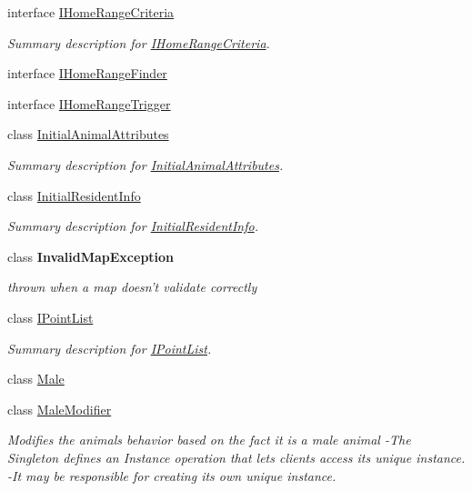 \begin{DoxyCompactItemize}
interface \hyperlink{interface_p_a_z___dispersal_1_1_i_home_range_criteria}{I\-Home\-Range\-Criteria}
\begin{DoxyCompactList}\small\item\em Summary description for \hyperlink{interface_p_a_z___dispersal_1_1_i_home_range_criteria}{I\-Home\-Range\-Criteria}. \end{DoxyCompactList}\item 
interface \hyperlink{interface_p_a_z___dispersal_1_1_i_home_range_finder}{I\-Home\-Range\-Finder}
\item 
interface \hyperlink{interface_p_a_z___dispersal_1_1_i_home_range_trigger}{I\-Home\-Range\-Trigger}
\item 
class \hyperlink{class_p_a_z___dispersal_1_1_initial_animal_attributes}{Initial\-Animal\-Attributes}
\begin{DoxyCompactList}\small\item\em Summary description for \hyperlink{class_p_a_z___dispersal_1_1_initial_animal_attributes}{Initial\-Animal\-Attributes}. \end{DoxyCompactList}\item 
class \hyperlink{class_p_a_z___dispersal_1_1_initial_resident_info}{Initial\-Resident\-Info}
\begin{DoxyCompactList}\small\item\em Summary description for \hyperlink{class_p_a_z___dispersal_1_1_initial_resident_info}{Initial\-Resident\-Info}. \end{DoxyCompactList}\item 
class {\bfseries Invalid\-Map\-Exception}
\begin{DoxyCompactList}\small\item\em thrown when a map doesn't validate correctly \end{DoxyCompactList}\item 
class \hyperlink{class_p_a_z___dispersal_1_1_i_point_list}{I\-Point\-List}
\begin{DoxyCompactList}\small\item\em Summary description for \hyperlink{class_p_a_z___dispersal_1_1_i_point_list}{I\-Point\-List}. \end{DoxyCompactList}\item 
class \hyperlink{class_p_a_z___dispersal_1_1_male}{Male}
\item 
class \hyperlink{class_p_a_z___dispersal_1_1_male_modifier}{Male\-Modifier}
\begin{DoxyCompactList}\small\item\em Modifies the animals behavior based on the fact it is a male animal -\/\-The Singleton defines an Instance operation that lets clients access its unique instance. -\/\-It may be responsible for creating its own unique instance. \end{DoxyCompactList}\item 

\end{DoxyCompactItemize}
